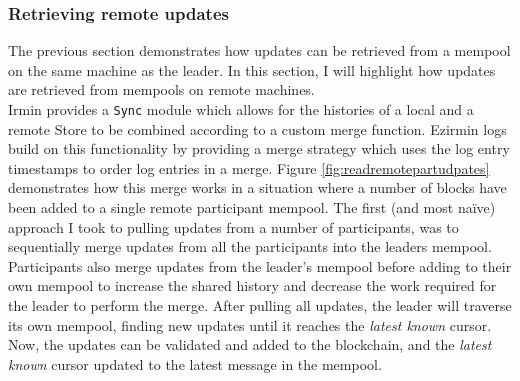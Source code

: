 \documentclass[12pt,a4paper,twoside,openright]{report}
\begin{document}
			\subsubsection*{Retrieving remote updates}
			The previous section demonstrates how updates can be retrieved from a mempool on the same machine as the leader.
			In this section, I will highlight how updates are retrieved from mempools on remote machines.\\
			
			Irmin provides a \texttt{Sync} module which allows for the histories of a local and a remote Store to be combined according to a custom merge function.
			Ezirmin logs build on this functionality by providing a merge strategy which uses the log entry timestamps to order log entries in a merge.
			Figure \ref{fig:readremotepartudpates} demonstrates how this merge works in a situation where a number of blocks have been added to a single remote participant mempool.
			The first (and most na{\"i}ve) approach I took to pulling updates from a number of participants, was to sequentially merge updates from all the participants into the leaders mempool.
			Participants also merge updates from the leader's mempool before adding to their own mempool to increase the shared history and decrease the work required for the leader to perform the merge.
			After pulling all updates, the leader will traverse its own mempool, finding new updates until it reaches the \textit{latest known} cursor. 
			Now, the updates can be validated and added to the blockchain, and the \textit{latest known} cursor updated to the latest message in the mempool.\\
\end{document}
